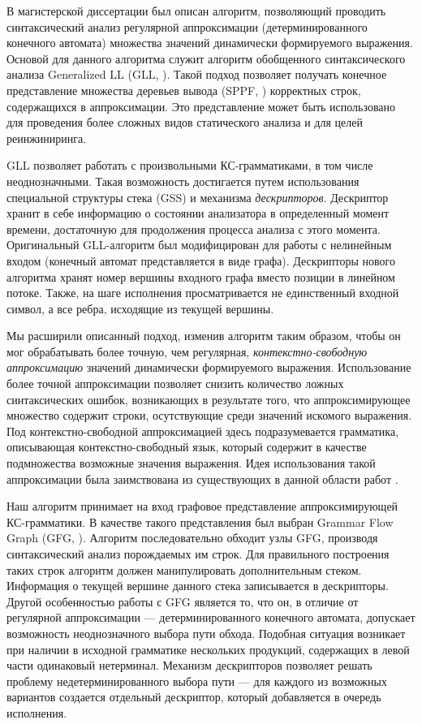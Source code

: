 \documentclass [a4paper] {article}
\begin{document}
В магистерской диссертации \cite{kovalev-spbu-gll_reg} был описан алгоритм, позволяющий проводить синтаксический анализ регулярной аппроксимации (детерминированного конечного автомата) множества значений динамически формируемого выражения. Основой для данного алгоритма служит алгоритм обобщенного синтаксического анализа Generalized LL (GLL, \cite{kovalev-spbu-gll}).
Такой подход позволяет получать конечное представление множества деревьев вывода (SPPF, \cite{kovalev-spbu-sppf}) корректных строк, содержащихся в аппроксимации. Это представление может быть использовано для проведения более сложных видов статического анализа и для целей реинжиниринга.

GLL позволяет работать с произвольными КС-грамматиками, в том числе неоднозначными. 
Такая возможность достигается путем использования специальной структуры стека (GSS) и механизма \textit{дескрипторов}. Дескриптор хранит в себе информацию о состоянии анализатора в определенный момент времени, достаточную для продолжения процесса анализа с этого момента.
Оригинальный GLL-алгоритм был модифицирован для работы с нелинейным входом (конечный автомат представляется в виде графа).
Дескрипторы нового алгоритма хранят номер вершины входного графа вместо позиции в линейном потоке. 
Также, на шаге исполнения просматривается не единственный входной символ, а все ребра, исходящие из текущей вершины.

Мы расширили описанный подход, изменив алгоритм таким образом, чтобы он мог обрабатывать более точную, чем регулярная, \textit{контекстно-свободную аппроксимацию} значений динамически формируемого выражения. 
Использование более точной аппроксимации позволяет снизить количество ложных синтаксических ошибок, возникающих в результате того, что аппроксимирующее множество содержит строки, осутствующие среди значений искомого выражения. 
Под контекстно-свободной аппроксимацией здесь подразумевается грамматика, описывающая контекстно-свободный язык, который содержит в качестве подмножества возможные значения выражения. 
Идея использования такой аппроксимации была заимствована из существующих в данной области работ \cite{kovalev-spbu-phpsa, kovalev-spbu-a_lr}. 

Наш алгоритм принимает на вход графовое представление аппроксимирующей  КС-грамматики. В качестве такого представления был выбран Grammar Flow Graph (GFG, \cite{kovalev-spbu-gfg}). 
Алгоритм последовательно обходит узлы GFG, производя синтаксический анализ порождаемых им строк. 
Для правильного построения таких строк алгоритм должен манипулировать дополнительным стеком. Информация о текущей вершине данного стека  записывается в дескрипторы. 
Другой особенностью работы с GFG является то, что он, в отличие от регулярной аппроксимации --- детерминированного конечного автомата, допускает возможность неоднозначного выбора пути обхода. 
Подобная ситуация возникает при наличии в исходной грамматике нескольких продукций, содержащих в левой части одинаковый нетерминал. 
Механизм дескрипторов позволяет решать проблему недетерминированного выбора пути --- для каждого из возможных вариантов создается отдельный дескриптор, который добавляется в очередь исполнения.
\end{document}
